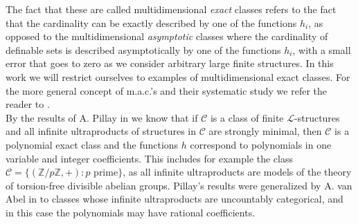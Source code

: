 \documentclass[11pt]{amsart}
\theoremstyle{definition}
\newcommand{\Le}{\mathcal{L}}
\begin{document}
The fact that these are called multidimensional \emph{exact} classes refers to the fact that the cardinality can be exactly described by one of the functions $h_i$, as opposed to the multidimensional \emph{asymptotic} classes where the cardinality of definable sets is described asymptotically by one of the functions $h_i$, with a small error that goes to zero as we consider arbitrary large finite structures. In this work we will restrict ourselves to examples of multidimensional exact classes. For the more general concept of m.a.c.'s and their systematic study we refer the reader to \cite{AMSW}.\\

By the results of A. Pillay in \cite{Pillay-stronglyminimalpsf} we know that if $\mathcal{C}$ is a class of finite $\Le$-structures and all infinite ultraproducts of structures in $\mathcal{C}$ are strongly minimal, then $\mathcal{C}$ is a polynomial exact class and the functions $h$ correspond to polynomials in one variable and integer coefficients. This includes for example the class $\mathcal{C}=\{(\mathbb{Z}/p\mathbb{Z},+):\text{$p$ prime}\}$, as all infinite ultraproducts are models of the theory of torsion-free divisible abelian groups. Pillay's results were generalized by A. van Abel in \cite{vanAbel-counting} to classes whose infinite ultraproducts are uncountably categorical, and in this case the polynomials may have rational coefficients. \\
\end{document}
